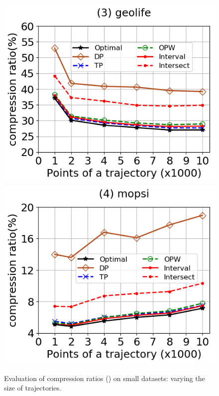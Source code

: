 \begin{figure}[tb!]
	\includegraphics[scale=0.315]{Figures/Exp-DAD-CR-size-geolife.png}	\hspace{1ex}
	\includegraphics[scale=0.315]{Figures/Exp-DAD-CR-size-mopsi.png}		
	\vspace{-3ex}
	\caption{\small Evaluation of compression ratios (\dad) on small datasets: varying the size of trajectories.}
	\label{fig:cr-dad-size}
	\vspace{-3ex}
\end{figure}



